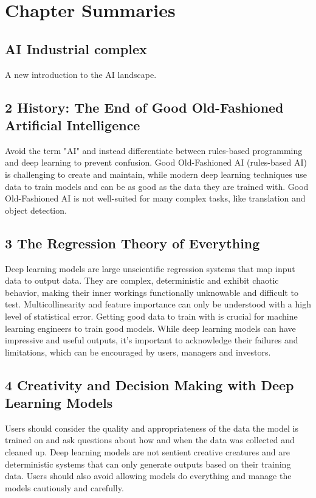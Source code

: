 \chapter*{Chapter Summaries}

\section*{AI Industrial complex}

A new introduction to the AI landscape.

\section*{2 History: The End of Good Old-Fashioned Artificial Intelligence}

Avoid the term "AI" and instead differentiate between rules-based programming and deep learning to prevent confusion. Good Old-Fashioned AI (rules-based AI) is challenging to create and maintain, while modern deep learning techniques use data to train models and can be as good as the data they are trained with. Good Old-Fashioned AI is not well-suited for many complex tasks, like translation and object detection.

\section*{3 The Regression Theory of Everything}

Deep learning models are large unscientific regression systems that map input data to output data. They are complex, deterministic and exhibit chaotic behavior, making their inner workings functionally unknowable and difficult to test. Multicollinearity and feature importance can only be understood with a high level of statistical error. Getting good data to train with is crucial for machine learning engineers to train good models. While deep learning models can have impressive and useful outputs, it's important to acknowledge their failures and limitations, which can be encouraged by users, managers and investors.

\section*{4 Creativity and Decision Making with Deep Learning Models}

Users should consider the quality and appropriateness of the data the model is trained on and ask questions about how and when the data was collected and cleaned up. Deep learning models are not sentient creative creatures and are deterministic systems that can only generate outputs based on their training data. Users should also avoid allowing models do everything and manage the models cautiously and carefully.

